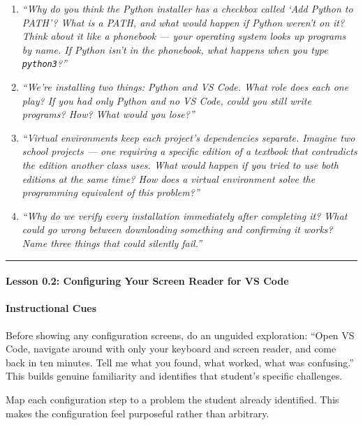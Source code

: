 \documentclass[
  justified,
  openright,
]{tufte-book}
\let\subsubsection\paragraph
\let\paragraph\paragraph
\let\subsubsection\paragraph
\let\paragraph\paragraph
\begin{document}
\begin{enumerate}
\def\labelenumi{\arabic{enumi}.}
\item
  \emph{``Why do you think the Python installer has a checkbox called
  `Add Python to PATH'? What is a PATH, and what would happen if Python
  weren't on it? Think about it like a phonebook --- your operating
  system looks up programs by name. If Python isn't in the phonebook,
  what happens when you type \texttt{python3}?''}
\item
  \emph{``We're installing two things: Python and VS Code. What role
  does each one play? If you had only Python and no VS Code, could you
  still write programs? How? What would you lose?''}
\item
  \emph{``Virtual environments keep each project's dependencies
  separate. Imagine two school projects --- one requiring a specific
  edition of a textbook that contradicts the edition another class uses.
  What would happen if you tried to use both editions at the same time?
  How does a virtual environment solve the programming equivalent of
  this problem?''}
\item
  \emph{``Why do we verify every installation immediately after
  completing it? What could go wrong between downloading something and
  confirming it works? Name three things that could silently fail.''}
\end{enumerate}

\begin{center}\rule{0.5\linewidth}{0.5pt}\end{center}

\subsubsection{Lesson 0.2: Configuring Your Screen Reader for VS
Code}\label{lesson-0.2-configuring-your-screen-reader-for-vs-code}

\paragraph{Instructional Cues}\label{instructional-cues-1}

Before showing any configuration screens, do an unguided exploration:
``Open VS Code, navigate around with only your keyboard and screen
reader, and come back in ten minutes. Tell me what you found, what
worked, what was confusing.'' This builds genuine familiarity and
identifies that student's specific challenges.

Map each configuration step to a problem the student already identified.
This makes the configuration feel purposeful rather than arbitrary.
\end{document}
